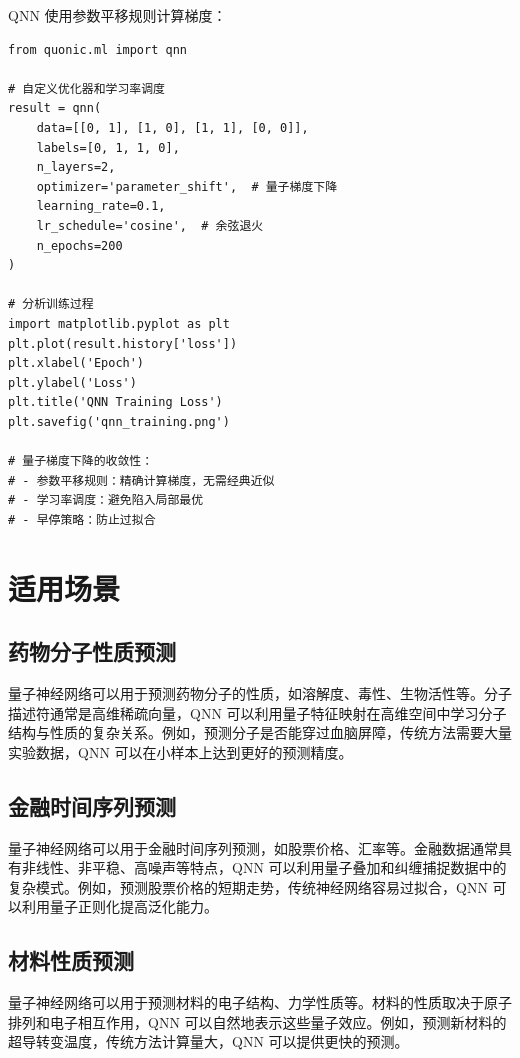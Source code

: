 \documentclass[12pt,a4paper]{article}
\begin{document}
QNN 使用参数平移规则计算梯度：

\begin{verbatim}
from quonic.ml import qnn

# 自定义优化器和学习率调度
result = qnn(
    data=[[0, 1], [1, 0], [1, 1], [0, 0]],
    labels=[0, 1, 1, 0],
    n_layers=2,
    optimizer='parameter_shift',  # 量子梯度下降
    learning_rate=0.1,
    lr_schedule='cosine',  # 余弦退火
    n_epochs=200
)

# 分析训练过程
import matplotlib.pyplot as plt
plt.plot(result.history['loss'])
plt.xlabel('Epoch')
plt.ylabel('Loss')
plt.title('QNN Training Loss')
plt.savefig('qnn_training.png')

# 量子梯度下降的收敛性：
# - 参数平移规则：精确计算梯度，无需经典近似
# - 学习率调度：避免陷入局部最优
# - 早停策略：防止过拟合
\end{verbatim}

\section{适用场景}

\subsection{药物分子性质预测}

量子神经网络可以用于预测药物分子的性质，如溶解度、毒性、生物活性等。分子描述符通常是高维稀疏向量，QNN 可以利用量子特征映射在高维空间中学习分子结构与性质的复杂关系。例如，预测分子是否能穿过血脑屏障，传统方法需要大量实验数据，QNN 可以在小样本上达到更好的预测精度。

\subsection{金融时间序列预测}

量子神经网络可以用于金融时间序列预测，如股票价格、汇率等。金融数据通常具有非线性、非平稳、高噪声等特点，QNN 可以利用量子叠加和纠缠捕捉数据中的复杂模式。例如，预测股票价格的短期走势，传统神经网络容易过拟合，QNN 可以利用量子正则化提高泛化能力。

\subsection{材料性质预测}

量子神经网络可以用于预测材料的电子结构、力学性质等。材料的性质取决于原子排列和电子相互作用，QNN 可以自然地表示这些量子效应。例如，预测新材料的超导转变温度，传统方法计算量大，QNN 可以提供更快的预测。
\end{document}
